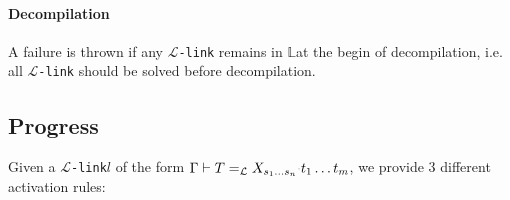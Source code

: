 \documentclass[sigconf,natbib=false,review]{acmart}
\newcommand{\llambda}{\ensuremath{\mathcal{L}}\xspace}
\newcommand{\linkMacro}[1]{\ensuremath{#1}\texttt{-link}\xspace}
\newcommand{\linkbeta}{\linkMacro{\llambda}}
\newcommand{\linkbetaM}[3]{\ensuremath{#1 \vdash #2 =_{\llambda} #3}}
\newcommand{\rhs}{rhs\xspace}
\newcommand{\linkStore}{\texorpdfstring{\ensuremath{\mathbb{L}}\xspace}{L}}
\begin{document}
\begin{comment}
\begin{proof}[Proof sketch]
  By construction, the lists $s_1\dots s_n$ and $t_1\dots t_m$ are built by splitting
  the list \elpiIn{Ag} from the original term \elpiIn{fapp [fuva A|Ag]}.
  $s_1\dots s_n$ is the longest prefix of the compiled terms in \elpiIn{Ag} which is
  in \llambda. Therefore, by definition of \llambda, $t_1$ must appear  
  in $s_1\dots s_n$, otherwise $s_1\dots s_n$ is not the longest prefix in
  \llambda, or it is a term with a constructor of \elpiIn{tm} as functor.  
\end{proof}
\end{comment}

\paragraph{Decompilation}
A failure is thrown if any \linkbeta remains in \linkStore at the
begin of decompilation, i.e. all \linkbeta should be solved before decompilation.

\subsection{Progress}

\newcommand{\progBetaLL}{\emph{\llambda-progress-refine}\xspace}
\newcommand{\progBetaRH}{\emph{\llambda-progress-\rhs}\xspace}
\newcommand{\progBetaFail}{\emph{\llambda-progress-fail}\xspace}

Given a \linkbeta $l$ of the form \linkbetaM{\Gamma}{T}{\rhsBeta}, we provide
$3$ different activation rules:
\end{document}
